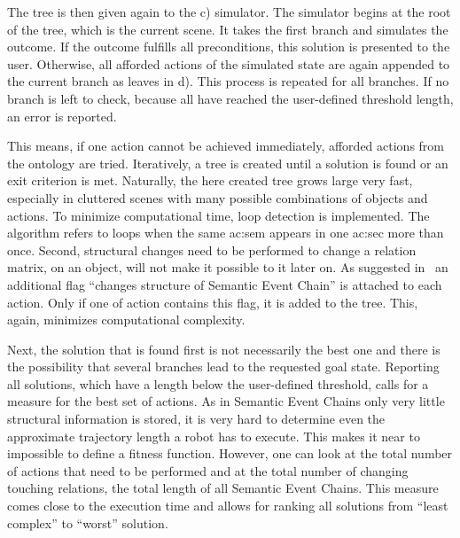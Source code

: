 The tree is then given again to the c) simulator.
The simulator begins at the root of the tree, which is the current scene.
It takes the first branch and simulates the outcome.
If the outcome fulfills all preconditions, this solution is presented to the user.
Otherwise, all afforded actions of the simulated state are again appended to the current branch as leaves in d).
This process is repeated for all branches.
If no branch is left to check, because all have reached the user-defined threshold length, an error is reported.


This means, if one action cannot be achieved immediately, afforded actions from the ontology are tried.
Iteratively, a tree is created until a solution is found or an exit criterion is met.
Naturally, the here created tree grows large very fast, especially in cluttered scenes with many possible combinations of objects and actions.
To minimize computational time, loop detection is implemented.
The algorithm refers to loops when the same \acrlong{ac:sem} appears in one \acrlong{ac:sec} more than once.
Second, structural changes need to be performed to change a relation matrix, \ie {} on an object, will not make it possible to  it later on.
As suggested in~\cite{navadaansaripatil2011, winandsbjornssonsaito2010} an additional flag ``changes structure of Semantic Event Chain'' is attached to each action.
Only if one of action contains this flag, it is added to the tree.
This, again, minimizes computational complexity.


Next, the solution that is found first is not necessarily the best one and there is the possibility that several branches lead to the requested goal state.
Reporting all solutions, which have a length below the user-defined threshold, calls for a measure for the best set of actions.
As in Semantic Event Chains only very little structural information is stored, it is very hard to determine even the approximate trajectory length a robot has to execute.
This makes it near to impossible to define a fitness function.
However, one can look at the total number of actions that need to be performed and at the total number of changing touching relations, \ie the total length of all Semantic Event Chains.
This measure comes close to the execution time and allows for ranking all solutions from ``least complex'' to ``worst'' solution.
